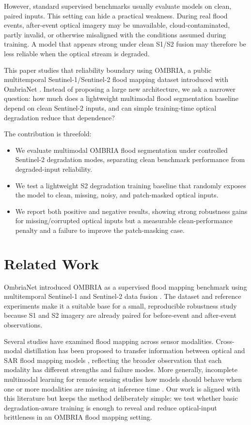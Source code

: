 \documentclass[review]{elsarticle}
\begin{document}
However, standard supervised benchmarks usually evaluate models on clean,
paired inputs. This setting can hide a practical weakness. During real flood
events, after-event optical imagery may be unavailable, cloud-contaminated,
partly invalid, or otherwise misaligned with the conditions assumed during
training. A model that appears strong under clean S1/S2 fusion may therefore be
less reliable when the optical stream is degraded.

This paper studies that reliability boundary using OMBRIA, a public
multitemporal Sentinel-1/Sentinel-2 flood mapping dataset introduced with
OmbriaNet \cite{drakonakis2022ombrianet}. Instead of proposing a large new
architecture, we ask a narrower question: how much does a lightweight multimodal
flood segmentation baseline depend on clean Sentinel-2 inputs, and can simple
training-time optical degradation reduce that dependence?

The contribution is threefold:

\begin{itemize}
  \item We evaluate multimodal OMBRIA flood segmentation under controlled
  Sentinel-2 degradation modes, separating clean benchmark performance from
  degraded-input reliability.
  \item We test a lightweight S2 degradation training baseline that randomly
  exposes the model to clean, missing, noisy, and patch-masked optical inputs.
  \item We report both positive and negative results, showing strong robustness
  gains for missing/corrupted optical inputs but a measurable clean-performance
  penalty and a failure to improve the patch-masking case.
\end{itemize}

\section{Related Work}

OmbriaNet introduced OMBRIA as a supervised flood mapping benchmark using
multitemporal Sentinel-1 and Sentinel-2 data fusion
\cite{drakonakis2022ombrianet}. The dataset and reference experiments make it a
suitable base for a small, reproducible robustness study because S1 and S2
imagery are already paired for before-event and after-event observations.

Several studies have examined flood mapping across sensor modalities.
Cross-modal distillation has been proposed to transfer information between
optical and SAR flood mapping models \cite{garg2023crossmodal}, reflecting the
broader observation that each modality has different strengths and failure
modes. More generally, incomplete multimodal learning for remote sensing studies
how models should behave when one or more modalities are missing at inference
time \cite{chen2023incomplete}. Our work is aligned with this literature but
keeps the method deliberately simple: we test whether basic degradation-aware
training is enough to reveal and reduce optical-input brittleness in an OMBRIA
flood mapping setting.
\end{document}
